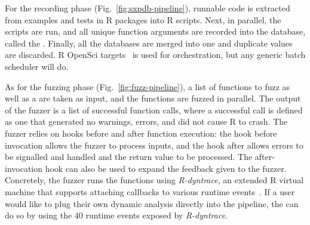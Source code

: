\documentclass[sigplan,anonymous,review]{acmart}
\begin{document}
For the recording phase (Fig.~\ref{fig:sxpdb-pipeline}), runnable code is extracted from examples and tests in R packages into R scripts.
Next, in parallel, the scripts are run, and all unique function arguments are recorded into the database, called the \sxpdb.
Finally, all the databases are merged into one and duplicate values are discarded.
R OpenSci targets~\cite{landau2021_targets} is used for orchestration, but any generic batch scheduler will do.

As for the fuzzing phase (Fig.~\ref{fig:fuzz-pipeline}), a list of functions to fuzz as well as a \sxpdb are taken as input, and the functions are fuzzed in parallel.
The output of the fuzzer is a list of successful function calls, where a successful call is defined as one that generated no warnings, errors, and did not cause R to crash.
The fuzzer relies on hooks before and after function execution: the hook before invocation allows the fuzzer to process inputs, and the hook after allows errors to be signalled and handled and the return value to be processed.
The after-invocation hook can also be used to expand the feedback given to the fuzzer.
Concretely, the fuzzer runs the functions using \emph{R-dyntrace}, an extended R virtual machine that supports attaching callbacks to various runtime events~\cite{goel2019}.
If a user would like to plug their own dynamic analysis directly into the pipeline, the can do so by using the 40 runtime events exposed by \emph{R-dyntrace}.
\end{document}
